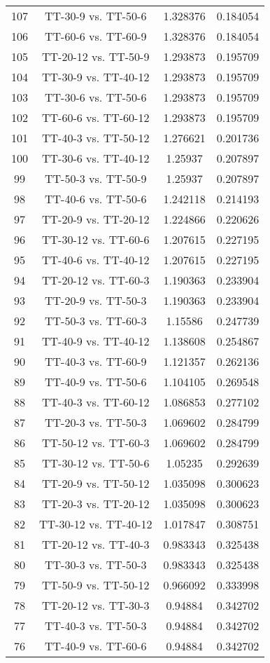 \documentclass[a4paper,10pt]{article}
\begin{document}
\begin{landscape}
\begin{table}[!htp]
\begin{tabular}{cccc}
107&TT-30-9 vs. TT-50-6&1.328376&0.184054\\
106&TT-60-6 vs. TT-60-9&1.328376&0.184054\\
105&TT-20-12 vs. TT-50-9&1.293873&0.195709\\
104&TT-30-9 vs. TT-40-12&1.293873&0.195709\\
103&TT-30-6 vs. TT-50-6&1.293873&0.195709\\
102&TT-60-6 vs. TT-60-12&1.293873&0.195709\\
101&TT-40-3 vs. TT-50-12&1.276621&0.201736\\
100&TT-30-6 vs. TT-40-12&1.25937&0.207897\\
99&TT-50-3 vs. TT-50-9&1.25937&0.207897\\
98&TT-40-6 vs. TT-50-6&1.242118&0.214193\\
97&TT-20-9 vs. TT-20-12&1.224866&0.220626\\
96&TT-30-12 vs. TT-60-6&1.207615&0.227195\\
95&TT-40-6 vs. TT-40-12&1.207615&0.227195\\
94&TT-20-12 vs. TT-60-3&1.190363&0.233904\\
93&TT-20-9 vs. TT-50-3&1.190363&0.233904\\
92&TT-50-3 vs. TT-60-3&1.15586&0.247739\\
91&TT-40-9 vs. TT-40-12&1.138608&0.254867\\
90&TT-40-3 vs. TT-60-9&1.121357&0.262136\\
89&TT-40-9 vs. TT-50-6&1.104105&0.269548\\
88&TT-40-3 vs. TT-60-12&1.086853&0.277102\\
87&TT-20-3 vs. TT-50-3&1.069602&0.284799\\
86&TT-50-12 vs. TT-60-3&1.069602&0.284799\\
85&TT-30-12 vs. TT-50-6&1.05235&0.292639\\
84&TT-20-9 vs. TT-50-12&1.035098&0.300623\\
83&TT-20-3 vs. TT-20-12&1.035098&0.300623\\
82&TT-30-12 vs. TT-40-12&1.017847&0.308751\\
81&TT-20-12 vs. TT-40-3&0.983343&0.325438\\
80&TT-30-3 vs. TT-50-3&0.983343&0.325438\\
79&TT-50-9 vs. TT-50-12&0.966092&0.333998\\
78&TT-20-12 vs. TT-30-3&0.94884&0.342702\\
77&TT-40-3 vs. TT-50-3&0.94884&0.342702\\
76&TT-40-9 vs. TT-60-6&0.94884&0.342702\\

\end{tabular}
\end{table}
\end{landscape}
\end{document}
